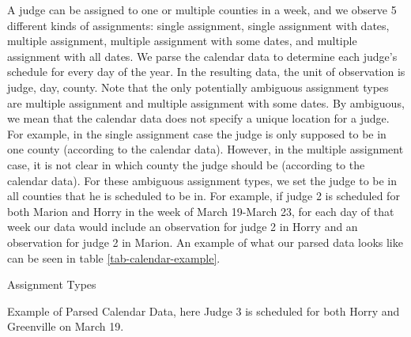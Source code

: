 \documentclass[11pt]{article}
\theoremstyle{ModifiedStyle}
\begin{document}
      A judge can be assigned to one or multiple counties in a week, and we observe 5 different kinds of assignments: single assignment, single assignment with dates, multiple assignment, multiple assignment with some dates, and multiple assignment with all dates. We parse the calendar data to determine each judge's schedule for every day of the year. In the resulting data, the unit of observation is judge, day, county. Note that the only potentially ambiguous assignment types are multiple assignment and multiple assignment with some dates. By ambiguous, we mean that the calendar data does not specify a unique location for a judge. For example, in the single assignment case the judge is only supposed to be in one county (according to the calendar data). However, in the multiple assignment case, it is not clear in which county the judge should be (according to the calendar data). For these ambiguous assignment types, we set the judge to be in all counties that he is scheduled to be in. For example, if judge 2 is scheduled for both Marion and Horry in the week of March 19-March 23, for each day of that week our data would include an observation for judge 2 in Horry and an observation for judge 2 in Marion. An example of what our parsed data looks like can be seen in table \ref{tab-calendar-example}.

      \begin{table}[H]
        \centering
        \caption{Assignment Types}
        \label{tab-assignments}
        
      \end{table}

      \begin{table}[H]
        \centering
        \caption{Example of Parsed Calendar Data, here Judge 3 is scheduled for both Horry and Greenville on March 19.}
        \label{tab-calendar-example}
        
      \end{table}
\end{document}

